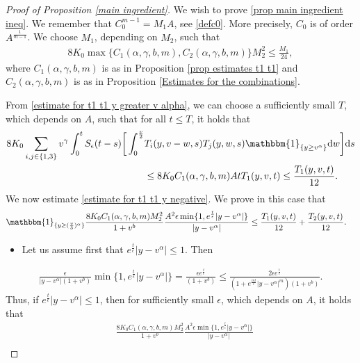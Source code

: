 \documentclass[11pt]{article}
\numberwithin{equation}{section}
\newcommand{\der}{\textup{d}}
\begin{document}
\begin{proof}[Proof of Proposition \ref{main ingredient}]
We wish to prove \eqref{prop main ingredient ineq}. We remember that $C_{0}^{m-1}=M_{1}A$, see \eqref{defc0}. More precisely, $C_{0}$ is of order $A^{\frac{1}{m-1}}$. We choose $M_{1}$, depending on $M_{2}$, such that 
\begin{align}\label{choice of m1}
    8K_{0}\max\{C_{1}(\alpha,\gamma,b,m),C_{2}(\alpha,\gamma,b,m)\}M_{2}^{2}\leq \frac{M_{1}}{24},
\end{align} 
where $C_{1}(\alpha,\gamma,b,m)$ is as in Proposition \ref{prop estimates t1 t1} and $C_{2}(\alpha,\gamma,b,m)$ is as in Proposition \ref{Estimates for the combinations}. 


From \eqref{estimate for t1 t1 y greater v alpha}, we can choose a sufficiently small $T$, which depends on $A$, such that for all $t\leq T$, it holds that
\begin{align*}
 8K_{0}\sum_{i,j\in\{1,3\}}v^{\gamma}\int_{0}^{t}S_{\epsilon}(t-s)\bigg[\int_{0}^{\frac{v}{2}}&  T_{i}(y,v-w,s)T_{j}(y,w,s)\mathbbm{1}_{\{y\geq v^{\alpha}\}}\der w\bigg]\der s\\
 &\leq  8K_{0}C_{1}(\alpha,\gamma,b,m)At T_{1}(y,v,t)\leq \frac{T_{1}(y,v,t)}{12}.
 \end{align*}
We now  estimate \eqref{estimate for t1 t1 y negative}.  We prove in this case that 
\begin{align}\label{use also later}
     \mathbbm{1}_{\{y\geq (\frac{v}{3})^{\alpha}\}} \frac{  8K_{0}C_{1}(\alpha,\gamma,b,m)M_{2}^{2}}{1+v^{b}}\frac{A^{2}\epsilon \min\{1,e^{\frac{t}{\epsilon}}|y-v^{\alpha}|\}}{|y-v^{\alpha}|}& \leq \frac{T_{1}(y,v,t)}{12}+\frac{T_{2}(y,v,t)}{12}.
\end{align} 
\begin{itemize}
    \item Let us assume first that $e^{\frac{t}{\epsilon}}|y-v^{\alpha}|\leq 1$. Then 
\end{itemize}\begin{align}
    \frac{ \epsilon}{|y-v^{\alpha}|(1+v^{b})}\min\{1,e^{\frac{t}{\epsilon}}|y-v^{\alpha}|\}=\frac{\epsilon e^{\frac{t}{\epsilon}}}{(1+v^{b})}\leq \frac{2\epsilon e^{\frac{t}{\epsilon}}}{(1+e^{\frac{m t}{\epsilon}}|y-v^{\alpha}|^{m})(1+v^{b})}.
\end{align}
Thus, if $e^{\frac{t}{\epsilon}}|y-v^{\alpha}|\leq 1$, then for sufficiently small $\epsilon$, which depends on $A$, it holds that
\begin{align}\label{e2}
&  \frac{  8K_{0}C_{1}(\alpha,\gamma,b,m)M_{2}^{2}}{1+v^{b}} \frac{A^{2}\epsilon \min\{1,e^{\frac{t}{\epsilon}}|y-v^{\alpha}|\}}{|y-v^{\alpha}|}\nonumber \\

\end{align}
\end{proof}
\end{document}
